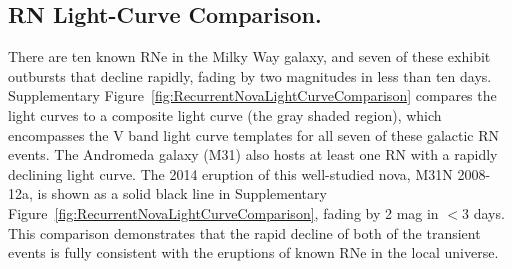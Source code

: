 \subsection{RN Light-Curve Comparison.}\label{sec:RNLightCurves}


There are ten known RNe in the Milky Way galaxy, and seven of
these exhibit outbursts that decline rapidly, fading by two magnitudes
in less than ten days\citep{Schaefer:2010}. 
Supplementary Figure~\ref{fig:RecurrentNovaLightCurveComparison}
compares the \spock light curves to a composite light curve (the gray
shaded region), which encompasses the V band light curve
templates\citep{Schaefer:2010} for all seven of these galactic RN
events.  The Andromeda galaxy (M31) also hosts at least one RN with a
rapidly declining light curve.  The 2014 eruption of this well-studied
nova, M31N 2008-12a, is shown as a solid black line in Supplementary
Figure~\ref{fig:RecurrentNovaLightCurveComparison}, fading by 2 mag in
$<3$ days.  This comparison demonstrates that the rapid decline of
both of the \spock transient events is fully consistent with the
eruptions of known RNe in the local universe.



